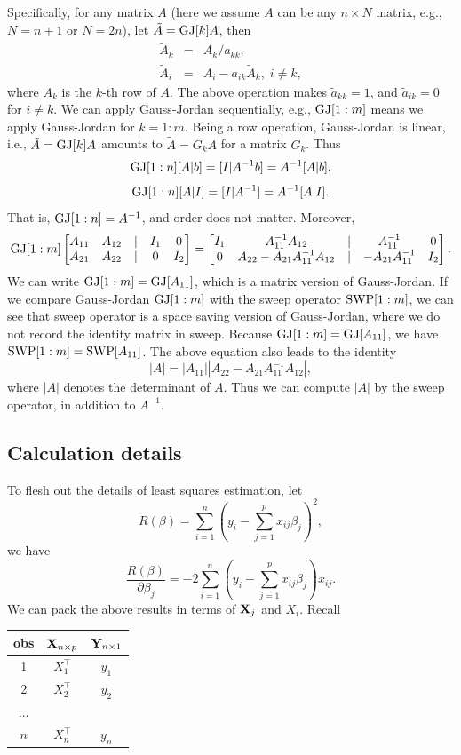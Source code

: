 \documentclass{article}\usepackage[]{graphicx}\usepackage[]{color}
\def\T{{\top}}
\def\A{\tilde{A}}
\def\a{\tilde{a}}
\def\S{{\rm SWP}}
\def\G{{\rm GJ}}
\def\X{{\bf X}}
\def\Y{{\bf Y}}
\begin{document}
Specifically, for any matrix $A$ (here we assume $A$ can be any $n \times N$ matrix, e.g., $N = n+1$ or $N = 2n$), let $\A = \G[k] A$, then 
\begin{eqnarray*} 
   \A_{k} &=& A_k/a_{kk}, \\
   \A_{i} &=& A_i - a_{ik} \A_k, \; i \neq k,
\end{eqnarray*}
where $A_k$ is the $k$-th row of $A$. The above operation makes $\a_{kk} = 1$, and $\a_{ik} = 0$ for $i \neq k$. We can apply Gauss-Jordan sequentially, e.g., $\G[1:m]$ means we apply  Gauss-Jordan  for $k = 1: m$. Being a row operation, Gauss-Jordan is linear, i.e., $\A = \G[k] A$ amounts to $\A = G_k A$ for a matrix $G_k$. Thus 
\[
\G[1:n][A|b]= [I| A^{-1}b ]= A^{-1}[A|b],  
\]
\[
\G[1:n] [A|I] = [I | A^{-1}]= A^{-1}[A|I].  
\]
That is, $\G[1:n] = A^{-1}$, and order does not matter. Moreover, 
\[
   \G[1:m]  \begin{bmatrix} A_{11} & A_{12} & | & I_1 & 0 \\ A_{21} & A_{22} & | & 0 & I_2 \end{bmatrix} = 
   \begin{bmatrix} I_1 & A_{11}^{-1} A_{12} & | & A_{11}^{-1} & 0 \\ 0& A_{22} - A_{21} A_{11}^{-1} A_{12} & | & - A_{21} A_{11}^{-1} & I_2 \end{bmatrix} . 
\]
We can write $\G[1:m] = \G[A_{11}]$, which is a matrix version of Gauss-Jordan. If we compare Gauss-Jordan $\G[1:m]$ with the sweep operator $\S[1:m]$, we can see that sweep operator is a space saving version of Gauss-Jordan, where we do not record the identity matrix in sweep. Because $\G[1:m] = \G[A_{11}]$, we have $\S[1:m] = \S[A_{11}]$. The above equation also leads to the identity 
\[
    |A| = |A_{11}||A_{22} - A_{21} A_{11}^{-1} A_{12}|, 
 \]
 where $|A|$ denotes the determinant of $A$. Thus we can compute $|A|$ by the sweep operator, in addition to $A^{-1}$. 

\subsection{Calculation details} 

To flesh out the details of least squares estimation, let 
\[
    R(\beta) = \sum_{i=1}^{n} \left(y_i - \sum_{j=1}^{p} x_{ij} \beta_j\right)^2, 
  \]
  we have 
  \[
     \frac{R(\beta)}{\partial \beta_j}  = -2 \sum_{i=1}^{n} \left(y_i - \sum_{j=1}^{p} x_{ij} \beta_j\right) x_{ij}. 
  \]
  We can pack the above results in terms of $\X_j$ and $X_i$. Recall 
  \begin{table}[h]
\centering
\begin{tabular}{|c|c|c|}
\hline
 obs & $\X_{n\times p}$ & $\Y_{n\times 1}$ \\
\hline\hline
 1   & $X_1^\T$         & $y_1$ \\
 2   & $X_2^\T$         & $y_2$ \\
...  &                 &\\
$n$  &  $X_n^\T$        & $y_n$ \\
\hline
\end{tabular}
\end{table}
\end{document}
